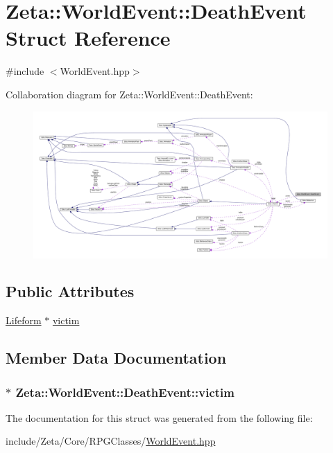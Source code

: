 \hypertarget{structZeta_1_1WorldEvent_1_1DeathEvent}{\section{Zeta\+:\+:World\+Event\+:\+:Death\+Event Struct Reference}
\label{structZeta_1_1WorldEvent_1_1DeathEvent}
}


{\ttfamily \#include $<$World\+Event.\+hpp$>$}



Collaboration diagram for Zeta\+:\+:World\+Event\+:\+:Death\+Event\+:
\nopagebreak
\begin{figure}[H]
\begin{center}
\leavevmode
\includegraphics[width=350pt]{structZeta_1_1WorldEvent_1_1DeathEvent__coll__graph}
\end{center}
\end{figure}
\subsection*{Public Attributes}
\begin{DoxyCompactItemize}
\item 
\hyperlink{classZeta_1_1Lifeform}{Lifeform} $\ast$ \hyperlink{structZeta_1_1WorldEvent_1_1DeathEvent_ac3c60b0c3b7a3b7f76abe273668e0054}{victim}
\end{DoxyCompactItemize}


\subsection{Member Data Documentation}
\hypertarget{structZeta_1_1WorldEvent_1_1DeathEvent_ac3c60b0c3b7a3b7f76abe273668e0054}{
\subsubsection[{victim}]{$\ast$ Zeta\+::\+World\+Event\+::\+Death\+Event\+::victim}}\label{structZeta_1_1WorldEvent_1_1DeathEvent_ac3c60b0c3b7a3b7f76abe273668e0054}


The documentation for this struct was generated from the following file\+:\begin{DoxyCompactItemize}
\item 
include/\+Zeta/\+Core/\+R\+P\+G\+Classes/\hyperlink{WorldEvent_8hpp}{World\+Event.\+hpp}\end{DoxyCompactItemize}
